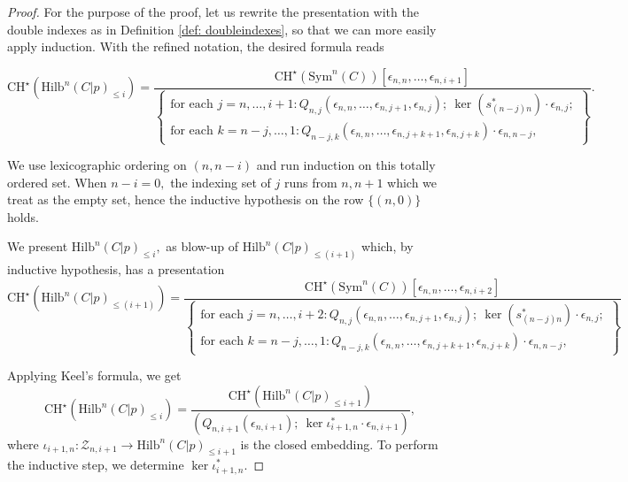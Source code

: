 \documentclass[10.5pt]{amsart}
\theoremstyle{definition}
\theoremstyle{definition}
\theoremstyle{definition}
\theoremstyle{definition}
\newcommand{\Hilb}{\mathrm{Hilb}}
\newcommand{\CHs}{\mathrm{CH}^\star}
\begin{document}
\begin{proof}

For the purpose of the proof, let us rewrite the presentation with the double indexes as in Definition \ref{def: doubleindexes}, so that we can more easily apply induction. With the refined notation, the desired formula reads 

$$\mathrm{CH}^\star(\Hilb^n(C|p)_{\leq i}) = \frac{\mathrm{CH}^\star(\mathrm{Sym}^n(C))[\epsilon_{n,n},\dots, \epsilon_{n,i+1}]}{\left\{\begin{array}{c}
  \text{for each } j = n, \dots, i+1: Q_{n,j}(\epsilon_{n,n},\dots,\epsilon_{n,j+1}, \epsilon_{n,j}); \ \ker(s_{(n-j)n}^*) \cdot \epsilon_{n,j};\\ \text{for each } k = n-j, \dots, 1: Q_{n-j,k}(\epsilon_{n,n},\dots, \epsilon_{n,j+k+1}, \epsilon_{n,j+k})\cdot \epsilon_{n,n-j},  
  \end{array}\right\}}.$$

  We use lexicographic ordering on $(n, n-i)$ and run induction on this totally ordered set. When $n-i = 0,$ the indexing set of $j$ runs from $n, n+1$ which we treat as the empty set, hence the inductive hypothesis on the row $\{(n,0)\}$ holds.

  We present $\Hilb^n(C|p)_{\leq i},$ as blow-up of $\Hilb^n(C|p)_{\leq (i+1)}$ which, by inductive hypothesis, has a presentation $$\CHs(\Hilb^n(C|p)_{\leq (i+1)}) = \frac{\mathrm{CH}^\star(\mathrm{Sym}^n(C))[\epsilon_{n,n},\dots, \epsilon_{n,i+2}]}{\left\{\begin{array}{c}
  \text{for each } j = n, \dots, i+2: Q_{n,j}(\epsilon_{n,n},\dots,\epsilon_{n,j+1}, \epsilon_{n,j}); \  \ker(s_{(n-j)n}^*) \cdot \epsilon_{n,j};\\\text{for each } k = n-j, \dots, 1: Q_{n-j,k}(\epsilon_{n,n},\dots, \epsilon_{n,j+k+1}, \epsilon_{n,j+k})\cdot \epsilon_{n,n-j}, 
  \end{array}\right\}}$$ 

  Applying Keel's formula, we get \[\mathrm{CH}^\star(\Hilb^n(C|p)_{\leq i}) = \frac{\mathrm{CH}^\star(\Hilb^n(C|p)_{\leq i+1})}{(Q_{n,i+1}(\epsilon_{n,i+1}); \ \ker \iota^*_{i+1,n} \cdot \epsilon_{n,i+1})},\] where $\iota_{i+1,n}: \mathcal{Z}_{n,i+1}\to \Hilb^{n}(C|p)_{\leq i+1}$ is the closed embedding. To perform the inductive step, we determine $\ker \iota^*_{i+1,n}.$
  

\end{proof}
\end{document}
